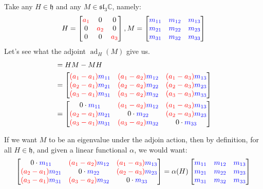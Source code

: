 \documentclass[a4paper]{article}
\newcommand{\C}{\mathbb{C}}
\theoremstyle{bfnote} %
\theoremstyle{bfnote}                  %
\theoremstyle{example}                       %
\theoremstyle{remark}                       %
\numberwithin{equation}{section}
\begin{document}
Take any  $H \in \mathfrak{h}$ and any $M \in \mathfrak{sl}_3\C$, namely: \[
		H = \def\a{\color{red}a} \begin{bmatrix} \a_1 & 0 & 0 \\ 0 & \a_2 &0 \\ 0 &0 &\a_3 \end{bmatrix}, M = \def\m{\color{blue}m} \begin{bmatrix} \m_{11} & \m_{12} & \m_{13} \\ \m_{21} & \m_{22} & \m_{23} \\ \m_{31} & \m_{32} & \m_{33} \end{bmatrix} 
	\]
Let's see what the adjoint $\operatorname{ad}_{H}(M)$ give us.
\begin{align*}
[H,M] &= HM - MH \\ &= \def\a{\color{red}a} \def\m{\color{blue}m} \begin{bmatrix} \color{red}{(}\a_1-\a_1)\m_{11} & \color{red}{(}\a_1-\a_2)\m_{12} & \color{red}{(}\a_1-\a_3)\m_{13} \\ \color{red}{(}\a_2-\a_1)\m_{21} & \color{red}{(}\a_2-\a_2)\m_{22} & \color{red}{(}\a_2-\a_3)\m_{23} \\ \color{red}{(}\a_3-\a_1)\m_{31} & \color{red}{(}\a_3-\a_2)\m_{32} & \color{red}{(}\a_3-\a_3)\m_{33} \end{bmatrix} \\
		      &=  \def\a{\color{red}a} \def\m{\color{blue}m} \begin{bmatrix} 0 \cdot \m_{11} & \color{red}{(}\a_1-\a_2)\m_{12} & \color{red}{(}\a_1-\a_3)\m_{13} \\ \color{red}{(}\a_2-\a_1)\m_{21} & 0 \cdot \m_{22} & \color{red}{(}\a_2-\a_3)\m_{23} \\ \color{red}{(}\a_3-\a_1)\m_{31} & \color{red}{(}\a_3-\a_2)\m_{32} & 0 \cdot \m_{33} \end{bmatrix} 
\end{align*}

If we want $M$ to be an eigenvalue under the adjoin action, then by definition, for all  $H \in \mathfrak{h}$, and given a linear functional $\alpha$, we would want: \[
	\def\a{\color{red}a} \def\m{\color{blue}m} \begin{bmatrix} 0 \cdot \m_{11} & \color{red}{(}\a_1-\a_2)\m_{12} & \color{red}{(}\a_1-\a_3)\m_{13} \\ \color{red}{(}\a_2-\a_1)\m_{21} & 0 \cdot \m_{22} & \color{red}{(}\a_2-\a_3)\m_{23} \\ \color{red}{(}\a_3-\a_1)\m_{31} & \color{red}{(}\a_3-\a_2)\m_{32} & 0 \cdot \m_{33} \end{bmatrix} = \alpha(H) \begin{bmatrix} \m_{11} & \m_{12} & \m_{13} \\ \m_{21} & \m_{22} & \m_{23} \\ \m_{31} & \m_{32} & \m_{33} \end{bmatrix}  
\] 
\end{document}
